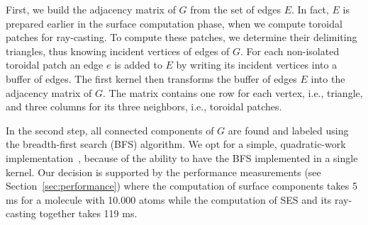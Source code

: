 First, we build the adjacency matrix of $G$ from the set of edges $E$.
In fact, $E$ is prepared earlier in the surface computation phase, when we compute toroidal patches for ray-casting.
To compute these patches, we determine their delimiting triangles, thus knowing incident vertices of edges of $G$.
For each non-isolated toroidal patch an edge $e$ is added to $E$ by writing its incident vertices into a buffer of edges.
The first kernel then transforms the buffer of edges $E$ into the adjacency matrix of $G$.
The matrix contains one row for each vertex, i.e., triangle, and three columns for its three neighbors, i.e., toroidal patches.%

In the second step, all connected components of $G$ are found and labeled using the breadth-first search (BFS) algorithm.
We opt for a simple, quadratic-work implementation~\cite{merrill2012scalable}, because of the ability to have the BFS implemented in a single kernel.
Our decision is supported by the performance measurements (see Section~\ref{sec:performance}) where the computation of surface components takes {\tweakedsim}5 ms for a molecule with {\tweakedsim}10.000 atoms while the computation of SES and its ray-casting together takes {\tweakedsim}119 ms.

